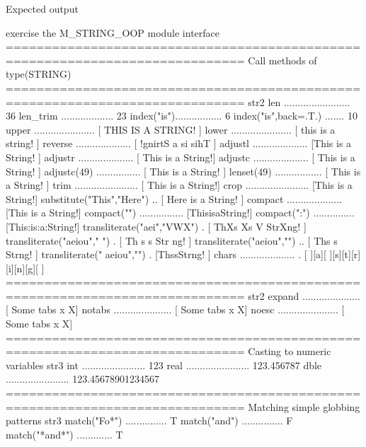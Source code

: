 Expected output \begin{DoxyVerb}exercise the M_STRING_OOP module interface
=============================================================================
Call methods of type(STRING)
=============================================================================
str2%
len ........................ 36
len_trim ................... 23
index("is")................. 6
index("is",back=.T.) ....... 10
upper ...................... [   THIS  IS  A  STRING!             ]
lower ...................... [   this  is  a  string!             ]
reverse .................... [             !gnirtS  a  si  sihT   ]
adjustl .................... [This  is  a  String!                ]
adjustr .................... [                This  is  a  String!]
adjustc .................... [        This  is  a  String!        ]
adjustc(49) ................ [              This  is  a  String!               ]
lenset(49) ................. [   This  is  a  String!                          ]
trim ....................... [   This  is  a  String!]
crop ....................... [This  is  a  String!]
substitute("This","Here") .. [   Here  is  a  String!             ]
compact .................... [This is a String!]
compact("") ................ [ThisisaString!]
compact(":") ............... [This:is:a:String!]
transliterate("aei","VWX") . [   ThXs  Xs  V  StrXng!             ]
transliterate("aeiou"," ") . [   Th s   s     Str ng!             ]
transliterate("aeiou","") .. [   Ths  s    Strng!                 ]
transliterate(" aeiou","") . [ThssStrng!                          ]
chars .................... . [ ][a][ ][s][t][r][i][n][g][ ]
=============================================================================
str2%
expand ..................... [         Some tabs          x   X]
notabs ..................... [                Some tabs          x    X]
noesc ...................... [  Some tabs    x X]
=============================================================================
Casting to numeric variables
str3%
int  .......................          123
real .......................    123.456787
dble .......................    123.45678901234567
=============================================================================
Matching simple globbing patterns
str3%
match("Fo*") ...............  T
match("and") ...............  F
match("*and*") .............  T

\end{DoxyVerb}
